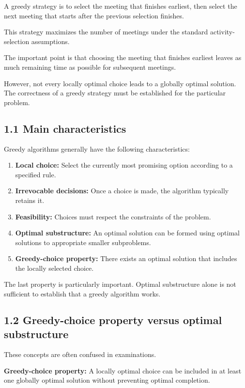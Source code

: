 A greedy strategy is to select the meeting that finishes earliest, then select the next meeting that starts after the previous selection finishes.

This strategy maximizes the number of meetings under the standard activity-selection assumptions.

The important point is that choosing the meeting that finishes earliest leaves as much remaining time as possible for subsequent meetings.

However, not every locally optimal choice leads to a globally optimal solution. The correctness of a greedy strategy must be established for the particular problem.

\subsection{1.1 Main characteristics}

Greedy algorithms generally have the following characteristics:

\begin{enumerate}
    \item \textbf{Local choice:} Select the currently most promising option according to a specified rule.
    \item \textbf{Irrevocable decisions:} Once a choice is made, the algorithm typically retains it.
    \item \textbf{Feasibility:} Choices must respect the constraints of the problem.
    \item \textbf{Optimal substructure:} An optimal solution can be formed using optimal solutions to appropriate smaller subproblems.
    \item \textbf{Greedy-choice property:} There exists an optimal solution that includes the locally selected choice.
\end{enumerate}

The last property is particularly important. Optimal substructure alone is not sufficient to establish that a greedy algorithm works.

\subsection{1.2 Greedy-choice property versus optimal substructure}

These concepts are often confused in examinations.

\textbf{Greedy-choice property:} A locally optimal choice can be included in at least one globally optimal solution without preventing optimal completion.

